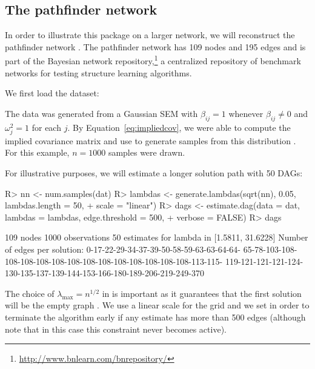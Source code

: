 \documentclass[article]{jss}
\renewcommand{\|}{\,|\,}
\begin{document}
\subsection{The pathfinder network}
\label{subsec:pathfinder}

In order to illustrate this package on a larger network, we will reconstruct the pathfinder network \citep{heckerman1992}. The pathfinder network has 109 nodes and 195 edges and is part of the Bayesian network repository,\footnote{\url{http://www.bnlearn.com/bnrepository/}} a centralized repository of benchmark networks for testing structure learning algorithms.

We first load the dataset:
%
\begin{CodeChunk}
\end{CodeChunk}
%
The data was generated from a Gaussian SEM with $\beta_{ij}=1$ whenever $\beta_{ij}$ and $\omega_{j}^{2}=1$ for each $j$. By Equation~\ref{eq:impliedcov}, we were able to compute the implied covariance matrix and use  to generate samples from this distribution \citep{genz2017}. For this example, $n=1000$ samples were drawn.

For illustrative purposes, we will estimate a longer solution path with 50 DAGs:
%
\begin{CodeChunk}
\begin{CodeInput}
R> nn <- num.samples(dat)
R> lambdas <- generate.lambdas(sqrt(nn), 0.05, lambdas.length = 50, 
+    scale = "linear")
R> dags <- estimate.dag(data = dat, lambdas = lambdas, edge.threshold = 500, 
+    verbose = FALSE)
R> dags
\end{CodeInput}
\begin{CodeOutput}                          
 109 nodes
 1000 observations
 50 estimates for lambda in [1.5811, 31.6228]
 Number of edges per solution: 0-17-22-29-34-37-39-50-58-59-63-63-64-64-
 65-78-103-108-108-108-108-108-108-108-108-108-108-108-108-108-113-115-
 119-121-121-121-124-130-135-137-139-144-153-166-180-189-206-219-249-370
\end{CodeOutput}
\end{CodeChunk}
%
The choice of $\lambda_{\max}=n^{1/2}$ in  is important as it guarantees that the first solution will be the empty graph \citep[see][Section~5.3]{aragam2015}. We use a linear scale for the grid and we set  in order to terminate the algorithm early if any estimate has more than 500 edges (although note that in this case this constraint never becomes active).
\end{document}
